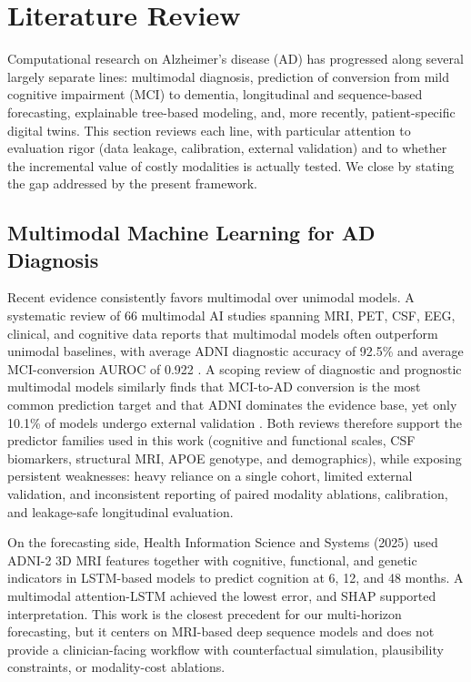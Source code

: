 \documentclass[11pt,a4paper]{article}
\begin{document}
\section{Literature Review}
\label{sec:related_work}

Computational research on Alzheimer's disease (AD) has progressed along several largely separate lines: multimodal diagnosis, prediction of conversion from mild cognitive impairment (MCI) to dementia, longitudinal and sequence-based forecasting, explainable tree-based modeling, and, more recently, patient-specific digital twins. This section reviews each line, with particular attention to evaluation rigor (data leakage, calibration, external validation) and to whether the incremental value of costly modalities is actually tested. We close by stating the gap addressed by the present framework.

\subsection{Multimodal Machine Learning for AD Diagnosis}
\label{subsec:rw_multimodal}

Recent evidence consistently favors multimodal over unimodal models. A systematic review of 66 multimodal AI studies spanning MRI, PET, CSF, EEG, clinical, and cognitive data reports that multimodal models often outperform unimodal baselines, with average ADNI diagnostic accuracy of 92.5\% and average MCI-conversion AUROC of 0.922 \cite{jmir2026multimodal}. A scoping review of diagnostic and prognostic multimodal models similarly finds that MCI-to-AD conversion is the most common prediction target and that ADNI dominates the evidence base, yet only 10.1\% of models undergo external validation \cite{xia2025scoping}. Both reviews therefore support the predictor families used in this work (cognitive and functional scales, CSF biomarkers, structural MRI, APOE genotype, and demographics), while exposing persistent weaknesses: heavy reliance on a single cohort, limited external validation, and inconsistent reporting of paired modality ablations, calibration, and leakage-safe longitudinal evaluation.

On the forecasting side, Health Information Science and Systems (2025) \cite{hiss2025forecast} used ADNI-2 3D MRI features together with cognitive, functional, and genetic indicators in LSTM-based models to predict cognition at 6, 12, and 48 months. A multimodal attention-LSTM achieved the lowest error, and SHAP supported interpretation. This work is the closest precedent for our multi-horizon forecasting, but it centers on MRI-based deep sequence models and does not provide a clinician-facing workflow with counterfactual simulation, plausibility constraints, or modality-cost ablations.
\end{document}
